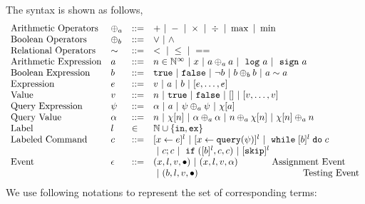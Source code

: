 The syntax is shown as follows,
\[
\begin{array}{llll}
\mbox{Arithmetic Operators} 
& \oplus_a & ::= & + ~|~ - ~|~ \times 
%
~|~ \div ~|~ \max ~|~ \min\\  
\mbox{Boolean Operators} 
& \oplus_b & ::= & \lor ~|~ \land
\\
%
\mbox{Relational Operators} 
& \sim & ::= & < ~|~ \leq ~|~ == 
\\  
%
\mbox{Arithmetic Expression} 
& \aexpr & ::= & 
n \in \mathbb{N}^{\infty} ~|~ {x} ~|~ \aexpr \oplus_a \aexpr 
 ~|~ \elog \aexpr  ~|~ \esign \aexpr
\\
%
\mbox{Boolean Expression} & \bexpr & ::= & 
%
\etrue ~|~ \efalse  ~|~ \neg \bexpr
 ~|~ \bexpr \oplus_b \bexpr
%
~|~ \aexpr \sim \aexpr 
\\
%
\mbox{Expression} & \expr & ::= & v ~|~ \aexpr ~|~ \bexpr ~|~ [\expr, \dots, \expr]
\\  
%
\mbox{Value} 
& v & ::= & { n ~|~ \etrue ~|~ \efalse ~|~ [] ~|~ [v, \dots, v]}  
\\
%
\mbox{Query Expression} 
& {\qexpr} & ::= 
& { \qval ~|~ \aexpr ~|~ \qexpr \oplus_a \qexpr ~|~ \chi[\aexpr]} 
\\
%
\mbox{Query Value} & \qval & ::= 
& {n ~|~ \chi[n] ~|~ \qval \oplus_a  \qval ~|~ n \oplus_a  \chi[n]
    ~|~ \chi[n] \oplus_a  n}
\\
%
\mbox{Label} 
& l & \in & \mathbb{N} \cup \{\lin, \lex\} 
\\ 
%
\mbox{Labeled Command} 
& {c} & ::= &   [\assign {{x}}{ {\expr}}]^{l} ~|~  [\assign {{x} } {{\query(\qexpr)}}]^{l}
~|~ {\ewhile [ \bexpr ]^{l} \edo {c} }
\\
&&&
~|~ {c};{c}  
~|~ \eif([\bexpr]{}^l , {c}, {c}) 
~|~ [\eskip]^l\\ 
\mbox{Event} 
& \event & ::= & 
    ({x}, l, v, \bullet) ~|~ ({x}, l, v, \qval)  ~~~~~~~~~~~ \mbox{Assignment Event} \\
&&& ~|~(\bexpr, l, v, \bullet)   ~~~~~~~~~~~~~~~~~~~~~~~~~~~~~~~~~~ \mbox{Testing Event}
\\
\end{array}
\]
We use following notations to represent the set of corresponding terms:
